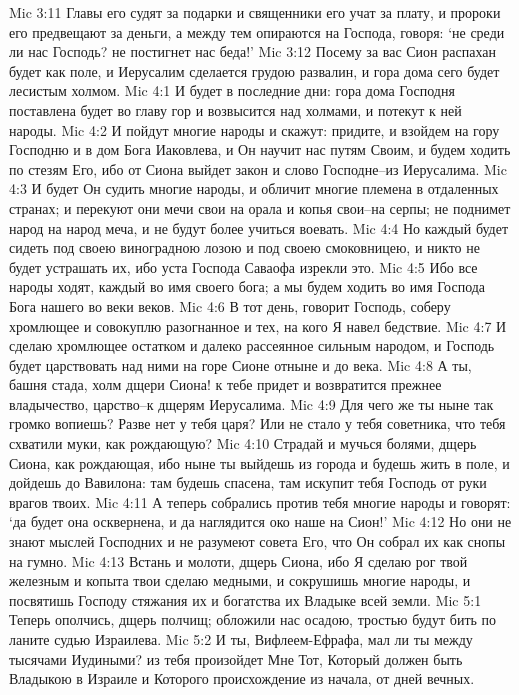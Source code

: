 Mic 3:11  Главы его судят за подарки и священники его учат за плату, и пророки его предвещают за деньги, а между тем опираются на Господа, говоря: `не среди ли нас Господь? не постигнет нас беда!'
Mic 3:12  Посему за вас Сион распахан будет как поле, и Иерусалим сделается грудою развалин, и гора дома сего будет лесистым холмом.
Mic 4:1  И будет в последние дни: гора дома Господня поставлена будет во главу гор и возвысится над холмами, и потекут к ней народы.
Mic 4:2  И пойдут многие народы и скажут: придите, и взойдем на гору Господню и в дом Бога Иаковлева, и Он научит нас путям Своим, и будем ходить по стезям Его, ибо от Сиона выйдет закон и слово Господне--из Иерусалима.
Mic 4:3  И будет Он судить многие народы, и обличит многие племена в отдаленных странах; и перекуют они мечи свои на орала и копья свои--на серпы; не поднимет народ на народ меча, и не будут более учиться воевать.
Mic 4:4  Но каждый будет сидеть под своею виноградною лозою и под своею смоковницею, и никто не будет устрашать их, ибо уста Господа Саваофа изрекли это.
Mic 4:5  Ибо все народы ходят, каждый во имя своего бога; а мы будем ходить во имя Господа Бога нашего во веки веков.
Mic 4:6  В тот день, говорит Господь, соберу хромлющее и совокуплю разогнанное и тех, на кого Я навел бедствие.
Mic 4:7  И сделаю хромлющее остатком и далеко рассеянное сильным народом, и Господь будет царствовать над ними на горе Сионе отныне и до века.
Mic 4:8  А ты, башня стада, холм дщери Сиона! к тебе придет и возвратится прежнее владычество, царство--к дщерям Иерусалима.
Mic 4:9  Для чего же ты ныне так громко вопиешь? Разве нет у тебя царя? Или не стало у тебя советника, что тебя схватили муки, как рождающую?
Mic 4:10  Страдай и мучься болями, дщерь Сиона, как рождающая, ибо ныне ты выйдешь из города и будешь жить в поле, и дойдешь до Вавилона: там будешь спасена, там искупит тебя Господь от руки врагов твоих.
Mic 4:11  А теперь собрались против тебя многие народы и говорят: `да будет она осквернена, и да наглядится око наше на Сион!'
Mic 4:12  Но они не знают мыслей Господних и не разумеют совета Его, что Он собрал их как снопы на гумно.
Mic 4:13  Встань и молоти, дщерь Сиона, ибо Я сделаю рог твой железным и копыта твои сделаю медными, и сокрушишь многие народы, и посвятишь Господу стяжания их и богатства их Владыке всей земли.
Mic 5:1  Теперь ополчись, дщерь полчищ; обложили нас осадою, тростью будут бить по ланите судью Израилева.
Mic 5:2  И ты, Вифлеем-Ефрафа, мал ли ты между тысячами Иудиными? из тебя произойдет Мне Тот, Который должен быть Владыкою в Израиле и Которого происхождение из начала, от дней вечных.
